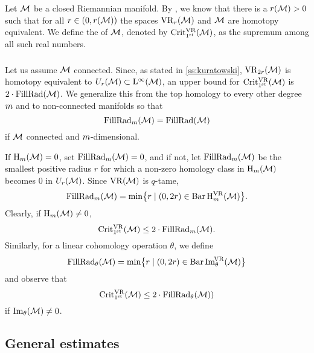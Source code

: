 \subsubsection{}\label{ss:first_critical_value}

Let \(\cM\) be a closed Riemannian manifold.
By \cite[Thm.3.5]{hausmann1995vietoris}, we know that there is a \(r(\cM) > 0\) such that for all \(r \in (0,r(\cM))\) the spaces \(\VR_r(\cM)\) and \(\cM\) are homotopy equivalent.
We define the  of \(\cM\), denoted by \(\crit(\cM)\), as the supremum among all such real numbers.


\subsubsection{}

Let us assume \(\cM\) connected.
Since, as stated in \cref{ss:kuratowski}, \(\VR_{2r}(\cM)\) is homotopy equivalent to \(U_r(\cM) \subset \rL^\infty(\cM)\), an upper bound for \(\crit(\cM)\) is \(2\cdot\fillrad(\cM)\).
We generalize this from the top homology to every other degree \(\degp\) and to non-connected manifolds so that
\[
\fillrad_\degp(\cM) = \fillrad(\cM)
\]
if \(\cM\) connected and \(\degp\)-dimensional.

If \(\rH_\degp(\cM) = 0\), set \(\fillrad_m(\cM) = 0\), and if not, let \(\fillrad_m(\cM)\) be the smallest positive radius $r$ for which a non-zero homology class in \(\rH_\degp(\cM)\) becomes \(0\) in \(U_r(\cM)\).
Since \(\VR(\cM)\) is \(q\)-tame,
\[
\fillrad_m(\cM) = \min\set[\big]{r \mid (0, 2r) \in \barc \rH^{\VR}_m(\cM)}.
\]
Clearly, if \(\rH_m(\cM) \neq 0\),
\[
\crit(\cM) \leq 2 \cdot \fillrad_m(\cM).
\]
Similarly, for a linear cohomology operation \(\theta\), we define
\[
\fillrad_\theta(\cM) = \min\set[\big]{r \mid (0, 2r) \in \barc \img_\theta^{\!\VR}(\cM)}
\]
and observe that
\[
\crit(\cM) \leq 2 \cdot \fillrad_\theta(\cM))
\]
if \(\img_\theta(\cM) \neq 0\).


\subsection{General estimates}\label{ss:barcode_general}

